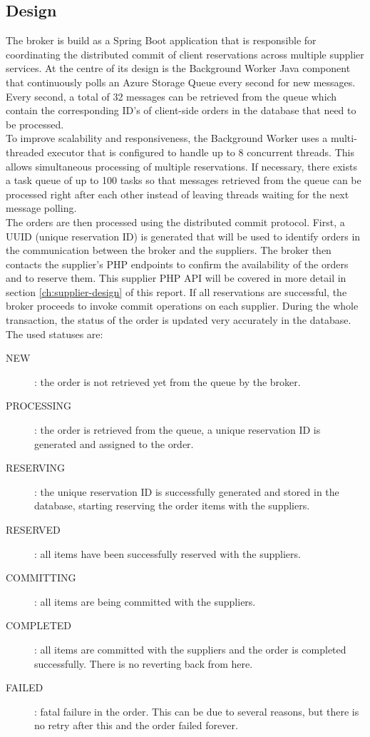 \documentclass[10pt,a4paper,kul]{kulakarticle} %
\begin{document}
		\subsection{Design}
		The broker is build as a Spring Boot application that is responsible for coordinating the distributed commit of client reservations across multiple supplier services. At the centre of its design is the Background Worker Java component that continuously polls an Azure Storage Queue every second for new messages. Every second, a total of 32 messages can be retrieved from the queue which  contain the corresponding ID's of client-side orders in the database that need to be processed.\\
		\newline
		To improve scalability and responsiveness, the Background Worker uses a multi-threaded executor that is configured to handle up to 8 concurrent threads. This allows simultaneous processing of multiple reservations. If necessary, there exists a task queue of up to 100 tasks so that messages retrieved from the queue can be processed right after each other instead of leaving threads waiting for the next message polling.\\
		\newline
		The orders are then processed using the distributed commit protocol. First, a UUID (unique reservation ID) is generated that will be used to identify orders in the communication between the broker and the suppliers. The broker then contacts the supplier's PHP endpoints to confirm the availability of the orders and to reserve them. This supplier PHP API will be covered in more detail in section \ref{ch:supplier-design} of this report. If all reservations are successful, the broker proceeds to invoke commit operations on each supplier. During the whole transaction, the status of the order is updated very accurately in the database. The used statuses are:
		
		\begin{description}
			\item[NEW]: the order is not retrieved yet from the queue by the broker.
			\item[PROCESSING]: the order is retrieved from the queue, a unique reservation ID is generated and assigned to the order.
			\item[RESERVING]: the unique reservation ID is successfully generated and stored in the database, starting reserving the order items with the suppliers.
			\item[RESERVED]: all items have been successfully reserved with the suppliers.
			\item[COMMITTING]: all items are being committed with the suppliers.
			\item[COMPLETED]: all items are committed with the suppliers and the order is completed successfully. There is no reverting back from here.
			\item[FAILED]: fatal failure in the order. This can be due to several reasons, but there is no retry after this and the order failed forever.
		\end{description}
		
\end{document}
